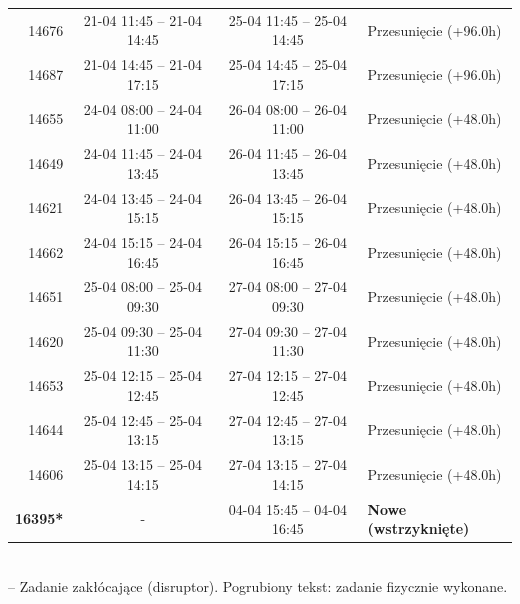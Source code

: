 \begin{table}[htbp]
\begin{tabular}{|r|c|c|l|}
14676 & 21-04 11:45 -- 21-04 14:45 & 25-04 11:45 -- 25-04 14:45 & Przesunięcie (+96.0h) \\ 
14687 & 21-04 14:45 -- 21-04 17:15 & 25-04 14:45 -- 25-04 17:15 & Przesunięcie (+96.0h) \\ 
14655 & 24-04 08:00 -- 24-04 11:00 & 26-04 08:00 -- 26-04 11:00 & Przesunięcie (+48.0h) \\ 
14649 & 24-04 11:45 -- 24-04 13:45 & 26-04 11:45 -- 26-04 13:45 & Przesunięcie (+48.0h) \\ 
14621 & 24-04 13:45 -- 24-04 15:15 & 26-04 13:45 -- 26-04 15:15 & Przesunięcie (+48.0h) \\ 
14662 & 24-04 15:15 -- 24-04 16:45 & 26-04 15:15 -- 26-04 16:45 & Przesunięcie (+48.0h) \\ 
14651 & 25-04 08:00 -- 25-04 09:30 & 27-04 08:00 -- 27-04 09:30 & Przesunięcie (+48.0h) \\ 
14620 & 25-04 09:30 -- 25-04 11:30 & 27-04 09:30 -- 27-04 11:30 & Przesunięcie (+48.0h) \\ 
14653 & 25-04 12:15 -- 25-04 12:45 & 27-04 12:15 -- 27-04 12:45 & Przesunięcie (+48.0h) \\ 
14644 & 25-04 12:45 -- 25-04 13:15 & 27-04 12:45 -- 27-04 13:15 & Przesunięcie (+48.0h) \\ 
14606 & 25-04 13:15 -- 25-04 14:15 & 27-04 13:15 -- 27-04 14:15 & Przesunięcie (+48.0h) \\ 
\hline
\textbf{16395*} & - & 04-04 15:45 -- 04-04 16:45 & \textbf{Nowe (wstrzyknięte)} \\ 
\hline
\end{tabular}
\\ {\footnotesize * -- Zadanie zakłócające (disruptor). Pogrubiony tekst: zadanie fizycznie wykonane.}
\end{table}

\vspace{0.8cm}
